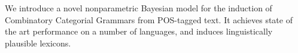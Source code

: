 We introduce a novel nonparametric Bayesian model for the induction of Combinatory Categorial Grammars from POS-tagged text. It achieves state of the
 art performance on a number of languages, and induces linguistically plausible
 lexicons.

